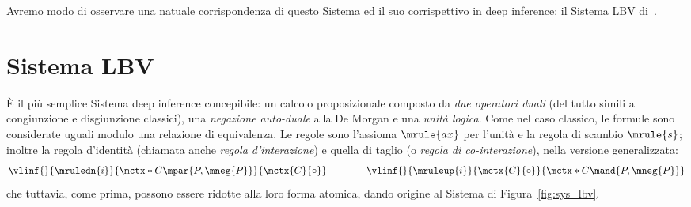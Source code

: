 \documentclass[12pt,a4paper,openright,twoside]{report}
\begin{document}
Avremo modo di osservare una natuale corrispondenza di questo Sistema ed il suo corrispettivo in deep inference: il Sistema \textsf{LBV} di~\cite{Gug02}.
\newpage

\section{Sistema LBV}

\`E il pi\`u semplice Sistema deep inference concepibile: un calcolo proposizionale composto da \emph{due operatori duali} (del tutto simili a congiunzione e disgiunzione classici), una \emph{negazione auto-duale} alla De Morgan e una \emph{unit\`a logica}. Come nel caso classico, le formule sono considerate uguali modulo una relazione di equivalenza. Le regole sono l'assioma $\mrule{ax}$ per l'unit\`a e la regola di scambio $\mrule{s}$; inoltre la regola d'identit\`a (chiamata anche \emph{regola d'interazione}) e quella di taglio (o \emph{regola di co-interazione}), nella versione generalizzata:
$$
	\vlinf{}{\mruledn{i}}{\mctx*{C}\mpar{P, \mneg{P}}}{\mctx{C}{\circ}}
	\qquad\qquad
	\vlinf{}{\mruleup{i}}{\mctx{C}{\circ}}{\mctx*{C}\mand{P, \mneg{P}}}
$$
che tuttavia, come prima, possono essere ridotte alla loro forma atomica, dando origine al Sistema di Figura~\ref{fig:sys_lbv}.
\end{document}

